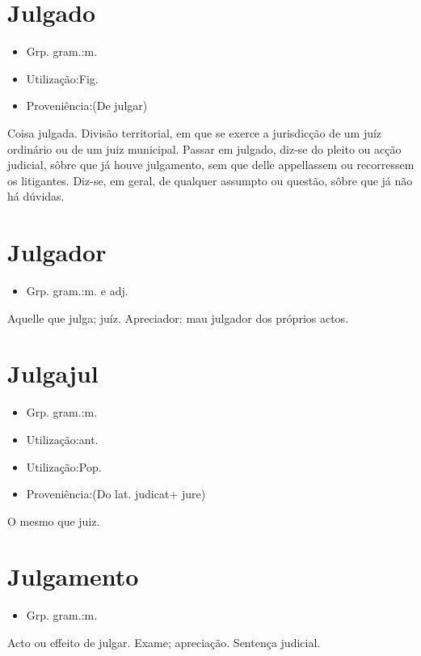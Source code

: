 \documentclass{article}
\begin{document}
\section{Julgado}
\begin{itemize}
\item {Grp. gram.:m.}
\end{itemize}
\begin{itemize}
\item {Utilização:Fig.}
\end{itemize}
\begin{itemize}
\item {Proveniência:(De \textunderscore julgar\textunderscore )}
\end{itemize}
Coisa julgada.
Divisão territorial, em que se exerce a jurisdicção de um juíz ordinário ou de um juiz municipal.
\textunderscore Passar em julgado\textunderscore , diz-se do pleito ou acção judicial, sôbre que já houve julgamento, sem que delle appellassem ou recorressem os litigantes.
Diz-se, em geral, de qualquer assumpto ou questão, sôbre que já não há dúvidas.
\section{Julgador}
\begin{itemize}
\item {Grp. gram.:m.  e  adj.}
\end{itemize}
Aquelle que julga; juíz.
Apreciador: \textunderscore mau julgador dos próprios actos\textunderscore .
\section{Julgajul}
\begin{itemize}
\item {Grp. gram.:m.}
\end{itemize}
\begin{itemize}
\item {Utilização:ant.}
\end{itemize}
\begin{itemize}
\item {Utilização:Pop.}
\end{itemize}
\begin{itemize}
\item {Proveniência:(Do lat. \textunderscore judicat\textunderscore  + \textunderscore jure\textunderscore )}
\end{itemize}
O mesmo que \textunderscore juiz\textunderscore .
\section{Julgamento}
\begin{itemize}
\item {Grp. gram.:m.}
\end{itemize}
Acto ou effeito de julgar.
Exame; apreciação.
Sentença judicial.
\end{document}
